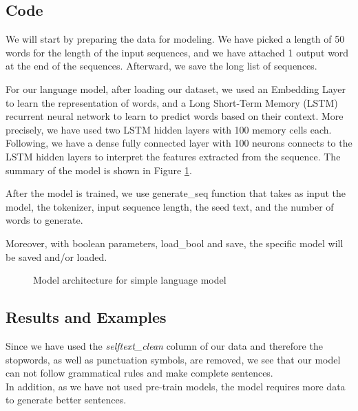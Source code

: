 \documentclass[12pt, a4paper]{article}
\begin{document}
	\subsection{Code}
	We will start by preparing the data for modeling. 
	We have picked a length of 50 words for the length of the input sequences, and we have attached 1 output word at the end of the sequences. Afterward, we save the long list of sequences.
	
	For our language model, after loading our dataset, we used an Embedding Layer to learn the representation of words, and a Long Short-Term Memory (LSTM) recurrent neural network to learn to predict words based on their context. More precisely, we have used two LSTM hidden layers with 100 memory cells each. Following, we have a dense fully connected layer with 100 neurons connects to the LSTM hidden layers to interpret the features extracted from the sequence. The summary of the model is shown in Figure \ref{normal-lm_arch}.
	
	After the model is trained, we use generate\_seq function that takes as input the model, the tokenizer, input sequence length, the seed text, and the number of words to generate. 
	
	Moreover, with boolean parameters, load\_bool and save, the specific model will be saved and/or loaded.
	\begin{figure}[H]
		\caption{Model architecture for simple language model}
		\label{normal-lm_arch}
	\end{figure}
	
	\subsection{Results and Examples}
	Since we have used the \emph{selftext\_clean} column of our data and therefore the stopwords, as well as punctuation symbols, are removed, we see that our model can not follow grammatical rules and make complete sentences. 
	\\In addition, as we have not used pre-train models, the model requires more data to generate better sentences. 
	
\end{document}
